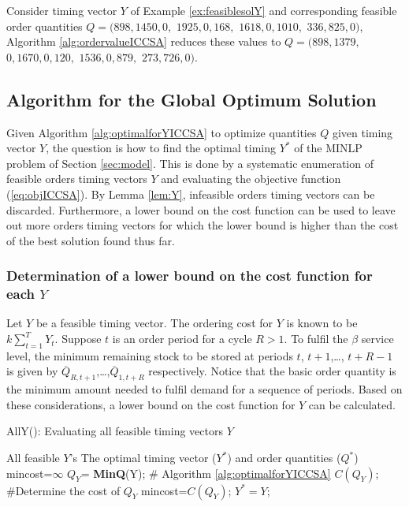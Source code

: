 \begin{example}
\label{ex:ex3}
	Consider timing vector $Y$ of Example \ref{ex:feasiblesolY} and corresponding feasible order quantities  $Q=(898,1450,0,$ $1925,0,168,$ $1618,0,1010,$ $336,825,0)$, Algorithm \ref{alg:ordervalueICCSA} reduces these values to $Q= (898,1379,$ $0,1670,0,120,$ $1536,0,879,$ $273,726,0)$.
\end{example}

\subsection{Algorithm for the Global Optimum Solution}

Given Algorithm \ref{alg:optimalforYICCSA} to optimize quantities $Q$ given timing vector $Y$, the question is how to find the optimal timing $Y^*$ of the MINLP problem of Section \ref{sec:model}. This is done by a systematic enumeration of feasible  orders timing vectors $Y$  and evaluating the objective function (\ref{eq:objICCSA}). By Lemma \ref{lem:Y}, infeasible  orders timing vectors can be discarded. Furthermore, a lower bound on the cost function can be used to leave out more orders timing vectors for which the lower bound is higher than the cost of the best solution found thus far.

\subsubsection{Determination of a lower bound on the cost function for each $Y$}
\label{sec:lowerbound}
Let $Y$ be a feasible timing vector. The ordering cost for $Y$ is known to be $k \sum\limits_{t=1}^{T}Y_t$. Suppose $t$ is an order period for a cycle $R>1$.  To fulfil the $\beta$ service level, the minimum remaining stock to be stored at periods $t$, $t+1$,\ldots, $t+R-1$ is given by  $\overline Q_{R,t+1}$,\ldots,$\overline Q_{1,t+R}$ respectively. Notice that the basic order quantity is the minimum amount needed to fulfil demand for a sequence of periods. Based on these considerations, a lower bound on the cost function for $Y$ can be calculated.

\begin{algorithm}[h]
\caption{AllY(): Evaluating all feasible timing vectors $Y$}
\label{alg:bestYICCSA}
\begin{algorithmic}[1]
 \REQUIRE All feasible $Y$'s
 \ENSURE The optimal timing vector ($Y^*$) and order quantities ($Q^*$)
 \medskip
\STATE mincost=$\infty$
  \label{bestY:line:LB}
\STATE $Q_Y$=  \textbf{MinQ}(Y);   \label{bestY:line:NLPsolver} \hfill \# Algorithm \ref{alg:optimalforYICCSA}
\STATE $C(Q_Y)$; \hfill \#Determine the cost of $Q_Y$
\STATE mincost=$C(Q_Y)$;
\STATE $Y^*=Y$;
\ENDIF
\ENDIF
\ENDFOR
\vskip 5pt
\end{algorithmic}
\end{algorithm}

